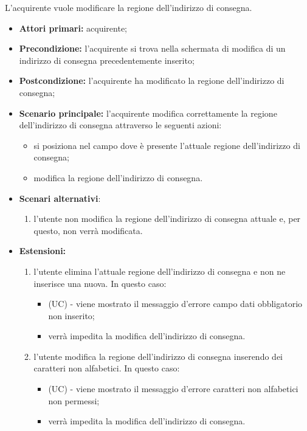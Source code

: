 L'acquirente vuole modificare la regione dell'indirizzo di consegna.
\begin{itemize}
    \item \textbf{Attori primari:} acquirente;
    \item \textbf{Precondizione:} l'acquirente si trova nella schermata di modifica di un indirizzo di consegna precedentemente inserito;
    \item \textbf{Postcondizione:} l'acquirente ha modificato la regione dell'indirizzo di consegna;
    \item \textbf{Scenario principale:} l'acquirente modifica correttamente la regione dell'indirizzo di consegna attraverso le seguenti azioni:
    \begin{itemize}
        \item si posiziona nel campo dove è presente l'attuale regione dell'indirizzo di consegna;
        \item modifica la regione dell'indirizzo di consegna.
    \end{itemize}
    \item \textbf{Scenari alternativi}:
    \begin{enumerate}[label=\lett]
        \item l'utente non modifica la regione dell'indirizzo di consegna attuale e, per questo, non verrà modificata.
    \end{enumerate}
    \item \textbf{Estensioni:}
    \begin{enumerate}[label=\lett]
        \item l'utente elimina l'attuale regione dell'indirizzo di consegna e non ne inserisce una nuova. In questo caso:
        \begin{itemize}
            \item (UC) - viene mostrato il messaggio d'errore campo dati obbligatorio non inserito;
            \item verrà impedita la modifica dell'indirizzo di consegna.
        \end{itemize}
        \item l'utente modifica la regione dell'indirizzo di consegna inserendo dei caratteri non alfabetici. In questo caso:
        \begin{itemize}
            \item (UC) - viene mostrato il messaggio d'errore caratteri non alfabetici non permessi;
            \item verrà impedita la modifica dell'indirizzo di consegna.
        \end{itemize}
    \end{enumerate}
\end{itemize}

